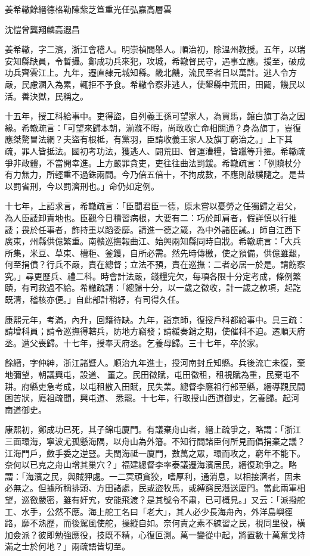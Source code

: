
\begin{pinyinscope}
姜希轍餘縉德格勒陳紫芝笪重光任弘嘉高層雲

沈愷曾龔翔麟高遐昌

姜希轍，字二濱，浙江會稽人。明崇禎間舉人。順治初，除溫州教授。五年，以瑞安知縣缺員，令暫攝。鄭成功兵來犯，攻城，希轍督民守，遇事立應。援至，破成功兵齊雲江上。九年，遷直隸元城知縣。畿北饑，流民至者日以萬計。逃人令方嚴，民慮溷入為累，輒拒不予食。希轍令察非逃人，使墾縣中荒田，田闢，饑民以活。善決獄，民稱之。

十五年，授工科給事中。吏得盜，自列義王孫可望家人，為買馬，鑲白旗丁為之因緣。希轍疏言：「可望來歸本朝，湔滌不暇，尚敢收亡命相關通？身為旗丁，豈復應桀驁冒法網？夫盜有根柢，有黨羽，臣請收義王家人及旗丁窮治之。」上下其疏，罪人皆抵法。國初考功法，獲逃人、闢荒田、督運漕糧，皆躐等升擢。希轍疏爭非政體，不當開幸進。上方嚴罪貪吏，吏往往曲法罰鍰。希轍疏言：「例贖杖分有力無力，所輕重不過銖兩間。今乃倍五倍十，不拘成數，不應則敲樸隨之。是昔以罰省刑，今以罰濟刑也。」命仍如定例。

十七年，上詔求言，希轍疏言：「臣聞君臣一德，原未嘗以憂勞之任獨歸之君父，為人臣諉卸責地也。臣觀今日積習病根，大要有二：巧於卸肩者，假詳慎以行推諉；畏於任事者，飾持重以蹈委靡。請進一德之箴，為中外諸臣誡。」師自江西下廣東，州縣供億繁重。南贛巡撫報曲江、始興兩知縣同時自戕。希轍疏言：「大兵所集，米豆、草束、槽秬、釜鑊，自所必需。然先時傳檄，使之預備，供億雖艱，何至捐僨？行兵不嚴，責在總督；立法不預，責在巡撫：二者必居一於是。請飭察究。」尋更歷兵、禮二科。時會計法嚴，錢糧完欠，每項各限十分定考成，條例繁賾，有司救過不給。希轍疏請：「總歸十分，以一歲之徵收，計一歲之款項，起訖既清，稽核亦便。」自此部計稍紓，有司得久任。

康熙元年，考滿，內升，回籍待缺。九年，詣京師，復授戶科都給事中。具三疏：請增科員；請令巡撫得轄兵，防地方竊發；請緩奏銷之期，使催科不迫。遷順天府丞。遭父喪歸。十七年，授奉天府丞。乞養母歸。三十七年，卒於家。

餘縉，字仲紳，浙江諸暨人。順治九年進士，授河南封丘知縣。兵後流亡未復，棄地彌望，朝議興屯，設道、董之。民田徵賦，屯田徵租，租視賦為重，民棄屯不耕。府縣吏急考成，以屯租散入田賦，民失業。總督李廕祖行部至縣，縉導觀民間困苦狀，廕祖疏聞，興屯道、悉罷。十七年，行取授山西道御史，乞養歸。起河南道御史。

康熙初，鄭成功已死，其子錦屯廈門。有議棄舟山者，縉上疏爭之，略謂：「浙江三面環海，寧波尤孤懸海隅，以舟山為外籓。不知行間諸臣何所見而倡捐棄之議？江海門戶，斂手委之逆豎。夫閩海祗一廈門，數萬之眾，環而攻之，窮年不能下。奈何以已克之舟山增其巢穴？」福建總督李率泰議遷海濱居民，縉復疏爭之。略謂：「海濱之民，與賊狎處。一二冥頑貪狡，嗜厚利，通消息，以相接濟者，固未必無之。但據所稱排頭、方田諸處，民或盜牧馬，或縛窮民潛送廈門。當此兩軍相望，巡徼嚴密，雖有奸宄，安能飛渡？是其號令不肅，已可概見。」又云：「派撥舵工、水手，公然不應。海上舵工名曰「老大」，其人必少長海舟內，外洋島嶼徑路，靡不熟歷，而後駕風使舵，操縱自如。奈何責之素不練習之民，視同里役，橫加僉派？彼即勉強應役，技既不精，心復叵測。萬一變從中起，將置數十萬奮戈持滿之士於何地？」兩疏語皆切至。


\end{pinyinscope}
